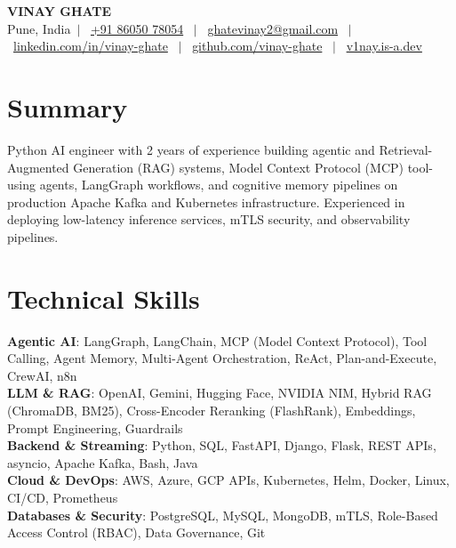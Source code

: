 \documentclass[a4paper,10.5pt]{article}
\makeatletter
\newcommand{\fullName}{Vinay Ghate}
\newcommand{\cityCountry}{Pune, India}
\newcommand{\phoneNumber}{+91 86050 78054}
\newcommand{\emailAddr}{ghatevinay2@gmail.com}
\newcommand{\linkedinUrl}{https://www.linkedin.com/in/vinay-ghate}
\newcommand{\githubUrl}{https://github.com/vinay-ghate}
\newcommand{\portfolioUrl}{https://v1nay.is-a.dev}
\makeatother
\begin{document}
\begin{center}
  {\fontsize{24}{28}\selectfont\bfseries \MakeUppercase{\fullName}} \\[4pt]
  \small
  \cityCountry \ $|$ \
  \href{tel:+918605078054}{\phoneNumber} \ $|$ \
  \href{mailto:\emailAddr}{ghatevinay2@gmail.com} \ $|$ \
  \href{\linkedinUrl}{linkedin.com/in/vinay-ghate} \ $|$ \
  \href{\githubUrl}{github.com/vinay-ghate} \ $|$ \
  \href{\portfolioUrl}{v1nay.is-a.dev}
\end{center}
\vspace{-8pt}

\section{Summary}
\small{
  Python AI engineer with 2 years of experience building agentic and Retrieval-Augmented Generation (RAG) systems, Model Context Protocol (MCP) tool-using agents, LangGraph workflows, and cognitive memory pipelines on production Apache Kafka and Kubernetes infrastructure. Experienced in deploying low-latency inference services, mTLS security, and observability pipelines.
}

\section{Technical Skills}
\begin{itemize}[leftmargin=0.12in, label={}]
  \small{
    \item{
      \textbf{Agentic AI}{: LangGraph, LangChain, MCP (Model Context Protocol), Tool Calling, Agent Memory, Multi-Agent Orchestration, ReAct, Plan-and-Execute, CrewAI, n8n} \\
      \textbf{LLM \& RAG}{: OpenAI, Gemini, Hugging Face, NVIDIA NIM, Hybrid RAG (ChromaDB, BM25), Cross-Encoder Reranking (FlashRank), Embeddings, Prompt Engineering, Guardrails} \\
      \textbf{Backend \& Streaming}{: Python, SQL, FastAPI, Django, Flask, REST APIs, asyncio, Apache Kafka, Bash, Java} \\
      \textbf{Cloud \& DevOps}{: AWS, Azure, GCP APIs, Kubernetes, Helm, Docker, Linux, CI/CD, Prometheus} \\
      \textbf{Databases \& Security}{: PostgreSQL, MySQL, MongoDB, mTLS, Role-Based Access Control (RBAC), Data Governance, Git}
    }
  }
\end{itemize}
\end{document}
